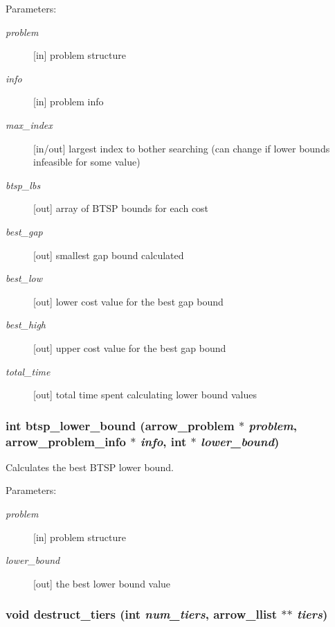 \begin{Desc}
\item[Parameters:]
\begin{description}
\item[{\em problem}]\mbox{[}in\mbox{]} problem structure \item[{\em info}]\mbox{[}in\mbox{]} problem info \item[{\em max\_\-index}]\mbox{[}in/out\mbox{]} largest index to bother searching (can change if lower bounds infeasible for some value) \item[{\em btsp\_\-lbs}]\mbox{[}out\mbox{]} array of BTSP bounds for each cost \item[{\em best\_\-gap}]\mbox{[}out\mbox{]} smallest gap bound calculated \item[{\em best\_\-low}]\mbox{[}out\mbox{]} lower cost value for the best gap bound \item[{\em best\_\-high}]\mbox{[}out\mbox{]} upper cost value for the best gap bound \item[{\em total\_\-time}]\mbox{[}out\mbox{]} total time spent calculating lower bound values \end{description}
\end{Desc}
\hypertarget{lib_2baltsp_2baltsp-ib_8c_90a22293c99499a2da22fd0d1a16acb4}{
\subsubsection[{btsp\_\-lower\_\-bound}]{\setlength{\rightskip}{0pt plus 5cm}int btsp\_\-lower\_\-bound ({\bf arrow\_\-problem} $\ast$ {\em problem}, \/  {\bf arrow\_\-problem\_\-info} $\ast$ {\em info}, \/  int $\ast$ {\em lower\_\-bound})}}
\label{lib_2baltsp_2baltsp-ib_8c_90a22293c99499a2da22fd0d1a16acb4}


Calculates the best BTSP lower bound. 

\begin{Desc}
\item[Parameters:]
\begin{description}
\item[{\em problem}]\mbox{[}in\mbox{]} problem structure \item[{\em lower\_\-bound}]\mbox{[}out\mbox{]} the best lower bound value \end{description}
\end{Desc}
\hypertarget{lib_2baltsp_2baltsp-ib_8c_086f8eb237774105f487040ef6ac62df}{
\subsubsection[{destruct\_\-tiers}]{\setlength{\rightskip}{0pt plus 5cm}void destruct\_\-tiers (int {\em num\_\-tiers}, \/  {\bf arrow\_\-llist} $\ast$$\ast$ {\em tiers})}}
\label{lib_2baltsp_2baltsp-ib_8c_086f8eb237774105f487040ef6ac62df}


